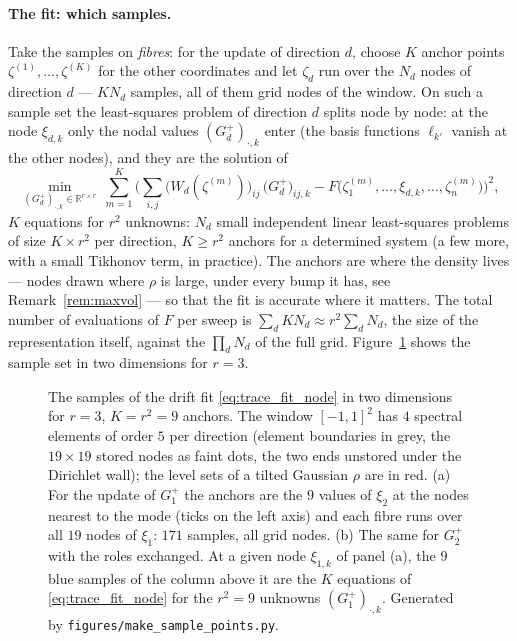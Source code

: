 \documentclass[11pt,a4paper]{article}
\newcommand{\R}{\mathbb{R}}
\theoremstyle{plain}
\theoremstyle{definition}
\theoremstyle{remark}
\begin{document}
\paragraph{The fit: which samples.}
Take the samples on \emph{fibres}: for the update of direction $d$, choose $K$ anchor points $\zeta^{(1)},\dots,\zeta^{(K)}$ for the other coordinates and let $\zeta_d$ run over the $N_d$ nodes of direction $d$ --- $KN_d$ samples, all of them grid nodes of the window. On such a sample set the least-squares problem of direction $d$ splits node by node: at the node $\xi_{d,k}$ only the nodal values $(G_d^+)_{\cdot,k}$ enter (the basis functions $\ell_{k'}$ vanish at the other nodes), and they are the solution of
\begin{equation}
  \min_{(G_d^+)_{\cdot,k}\in\R^{r\times r}}\ \sum_{m=1}^K\Big(\sum_{i,j}\big(W_d(\zeta^{(m)})\big)_{ij}\,\big(G_d^+\big)_{ij,k} - F\big(\zeta^{(m)}_1,\dots,\xi_{d,k},\dots,\zeta^{(m)}_n\big)\Big)^2 ,
  \label{eq:trace_fit_node}
\end{equation}
$K$ equations for $r^2$ unknowns: $N_d$ small independent linear least-squares problems of size $K\times r^2$ per direction, $K\ge r^2$ anchors for a determined system (a few more, with a small Tikhonov term, in practice). The anchors are where the density lives --- nodes drawn where $\rho$ is large, under every bump it has, see Remark~\ref{rem:maxvol} --- so that the fit is accurate where it matters. The total number of evaluations of $F$ per sweep is $\sum_dKN_d\approx r^2\sum_dN_d$, the size of the representation itself, against the $\prod_dN_d$ of the full grid. Figure~\ref{fig:samples} shows the sample set in two dimensions for $r=3$.

\begin{figure}[t]
\centering
\small

\caption{The samples of the drift fit \eqref{eq:trace_fit_node} in two dimensions for $r=3$, $K=r^2=9$ anchors. The window $[-1,1]^2$ has $4$ spectral elements of order $5$ per direction (element boundaries in grey, the $19\times19$ stored nodes as faint dots, the two ends unstored under the Dirichlet wall); the level sets of a tilted Gaussian $\rho$ are in red. (a) For the update of $G_1^+$ the anchors are the $9$ values of $\xi_2$ at the nodes nearest to the mode (ticks on the left axis) and each fibre runs over all $19$ nodes of $\xi_1$: $171$ samples, all grid nodes. (b) The same for $G_2^+$ with the roles exchanged. At a given node $\xi_{1,k}$ of panel (a), the $9$ blue samples of the column above it are the $K$ equations of \eqref{eq:trace_fit_node} for the $r^2=9$ unknowns $(G_1^+)_{\cdot,k}$. Generated by \texttt{figures/make\_sample\_points.py}.}
\label{fig:samples}
\end{figure}
\end{document}
